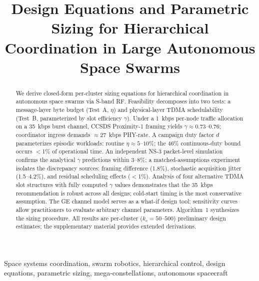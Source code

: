 \documentclass[journal]{IEEEtran}
\begin{document}
\title{Design Equations and Parametric Sizing for Hierarchical Coordination in Large Autonomous Space Swarms}

\author{
}


\maketitle

\begin{abstract}
We derive closed-form per-cluster sizing equations for hierarchical coordination in autonomous space swarms via S-band RF. Feasibility decomposes into two tests: a message-layer byte budget (Test~A, $\eta$) and physical-layer TDMA schedulability (Test~B, parameterized by slot efficiency $\gamma$). Under a 1~kbps per-node traffic allocation on a 35~kbps burst channel, CCSDS Proximity-1 framing yields $\gamma \approx 0.73$--$0.76$; coordinator ingress demands ${\approx}27$~kbps PHY-rate. A campaign duty factor $d$ parameterizes episodic workloads: routine $\eta \approx 5$--$10\%$; the $46\%$ continuous-duty bound occurs $<$1\% of operational time. An independent NS-3 packet-level simulation confirms the analytical $\gamma$ predictions within 3--8\%; a matched-assumptions experiment isolates the discrepancy sources: framing difference (1.8\%), stochastic acquisition jitter (1.5--4.2\%), and residual scheduling effects ($<$1\%). Analysis of four alternative TDMA slot structures with fully computed $\gamma$ values demonstrates that the 35~kbps recommendation is robust across all designs; cold-start timing is the most conservative assumption. The GE channel model serves as a what-if design tool; sensitivity curves allow practitioners to evaluate arbitrary channel parameters. Algorithm~1 synthesizes the sizing procedure. All results are per-cluster ($k_c = 50$--$500$) preliminary design estimates; the supplementary material provides extended derivations.
\end{abstract}

\begin{IEEEkeywords}
Space systems coordination, swarm robotics, hierarchical control, design equations, parametric sizing, mega-constellations, autonomous spacecraft
\end{IEEEkeywords}
\end{document}
